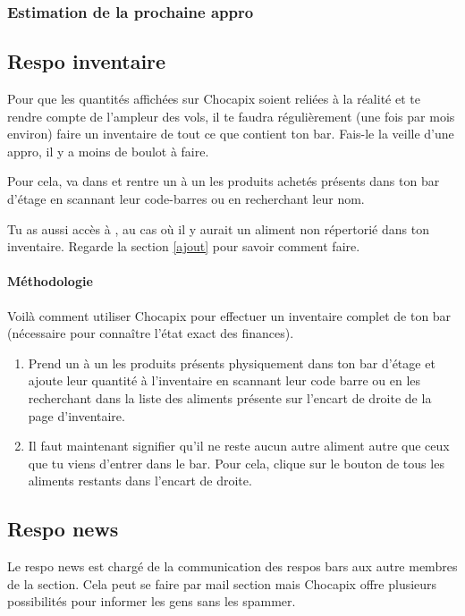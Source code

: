 \documentclass[12pt,french]{article}
\begin{document}
\subsubsection{Estimation de la prochaine appro}

\subsection{Respo inventaire}

Pour que les quantités affichées sur Chocapix soient reliées à la réalité et te rendre compte de l'ampleur des vols, il te faudra régulièrement (une fois par mois environ) faire un inventaire de tout ce que contient ton bar. Fais-le la veille d'une appro, il y a moins de boulot à faire.

Pour cela, va dans  et rentre un à un les produits achetés présents dans ton bar d'étage en scannant leur code-barres ou en recherchant leur nom.

Tu as aussi accès à , au cas où il y aurait un aliment non répertorié dans ton inventaire. Regarde la section \ref{ajout} pour savoir comment faire.

\paragraph{Méthodologie} Voilà comment utiliser Chocapix pour effectuer un inventaire complet de ton bar (nécessaire pour connaître l'état exact des finances).
\begin{enumerate}
	\item Prend un à un les produits présents physiquement dans ton bar d'étage et ajoute leur quantité à l'inventaire en scannant leur code barre ou en les recherchant dans la liste des aliments présente sur l'encart de droite de la page d'inventaire.
	\item Il faut maintenant signifier qu'il ne reste aucun autre aliment autre que ceux que tu viens d'entrer dans le bar. Pour cela, clique sur le bouton  de tous les aliments restants dans l'encart de droite.
\end{enumerate}

\subsection{Respo news}

Le respo news est chargé de la communication des respos bars aux autre membres de la section. Cela peut se faire par mail section mais Chocapix offre plusieurs possibilités pour informer les gens sans les spammer.
\end{document}
